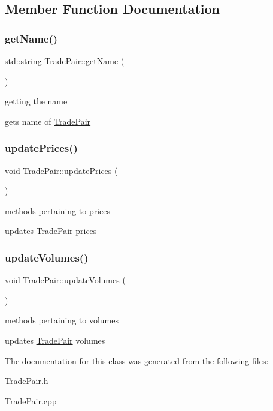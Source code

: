 \subsection{Member Function Documentation}
\mbox{\label{class_trade_pair_a81a10b0d32c7708e537056fe07856981}} 
\subsubsection{\texorpdfstring{get\+Name()}{getName()}}
{\footnotesize\ttfamily std\+::string Trade\+Pair\+::get\+Name (\begin{DoxyParamCaption}{ }\end{DoxyParamCaption})}



getting the name 

gets name of \mbox{\hyperlink{class_trade_pair}{Trade\+Pair}} \mbox{\label{class_trade_pair_a50360ccee465b011bfe4be572cd364ba}} 
\subsubsection{\texorpdfstring{update\+Prices()}{updatePrices()}}
{\footnotesize\ttfamily void Trade\+Pair\+::update\+Prices (\begin{DoxyParamCaption}{ }\end{DoxyParamCaption})}



methods pertaining to prices 

updates \mbox{\hyperlink{class_trade_pair}{Trade\+Pair}} prices \mbox{\label{class_trade_pair_a4f73937b9e6c60317eae5d8733907916}} 
\subsubsection{\texorpdfstring{update\+Volumes()}{updateVolumes()}}
{\footnotesize\ttfamily void Trade\+Pair\+::update\+Volumes (\begin{DoxyParamCaption}{ }\end{DoxyParamCaption})}



methods pertaining to volumes 

updates \mbox{\hyperlink{class_trade_pair}{Trade\+Pair}} volumes 

The documentation for this class was generated from the following files\+:\begin{DoxyCompactItemize}
\item 
Trade\+Pair.\+h\item 
Trade\+Pair.\+cpp\end{DoxyCompactItemize}

